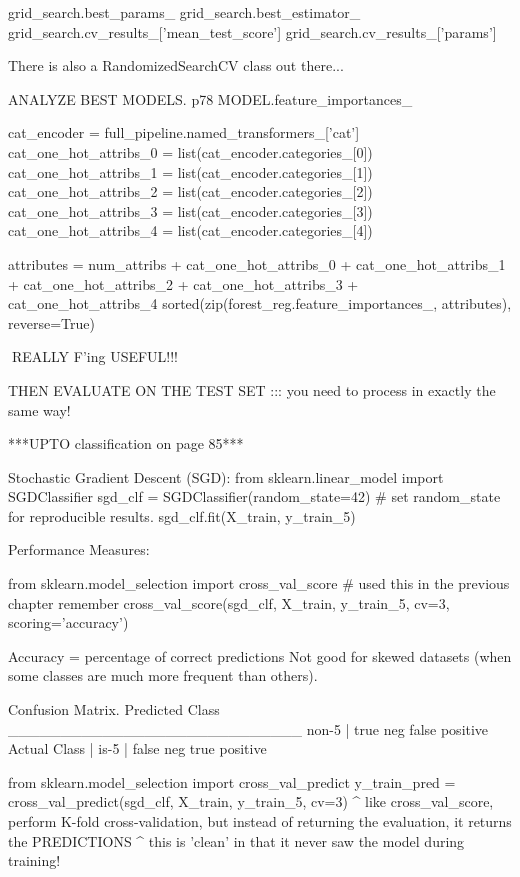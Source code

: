 grid_search.best_params_
grid_search.best_estimator_
grid_search.cv_results_['mean_test_score']
grid_search.cv_results_['params']

There is also a RandomizedSearchCV class out there...

ANALYZE BEST MODELS. p78
MODEL.feature_importances_

cat_encoder = full_pipeline.named_transformers_['cat']
cat_one_hot_attribs_0 = list(cat_encoder.categories_[0])
cat_one_hot_attribs_1 = list(cat_encoder.categories_[1])
cat_one_hot_attribs_2 = list(cat_encoder.categories_[2])
cat_one_hot_attribs_3 = list(cat_encoder.categories_[3])
cat_one_hot_attribs_4 = list(cat_encoder.categories_[4])

attributes = num_attribs + cat_one_hot_attribs_0 + cat_one_hot_attribs_1 + cat_one_hot_attribs_2 + cat_one_hot_attribs_3 + cat_one_hot_attribs_4
sorted(zip(forest_reg.feature_importances_, attributes), reverse=True)

^^^REALLY F'ing USEFUL!!!

THEN EVALUATE ON THE TEST SET ::: you need to process in exactly the same way!











***UPTO classification on page 85***

Stochastic Gradient Descent (SGD):
from sklearn.linear_model import SGDClassifier
sgd_clf = SGDClassifier(random_state=42) # set random_state for reproducible results.
sgd_clf.fit(X_train, y_train_5)

Performance Measures:

from sklearn.model_selection import cross_val_score # used this in the previous chapter remember
cross_val_score(sgd_clf, X_train, y_train_5, cv=3, scoring='accuracy')

Accuracy = percentage of correct predictions
Not good for skewed datasets (when some classes are much more frequent than others).

Confusion Matrix.
                    Predicted Class
                    ____________________________
             non-5 | true neg     false positive
Actual Class       |
             is-5  | false neg    true positive

from sklearn.model_selection import cross_val_predict             
y_train_pred = cross_val_predict(sgd_clf, X_train, y_train_5, cv=3)
^ like cross_val_score, perform K-fold cross-validation,
but instead of returning the evaluation, it returns the PREDICTIONS
^ this is 'clean' in that it never saw the model during training!

